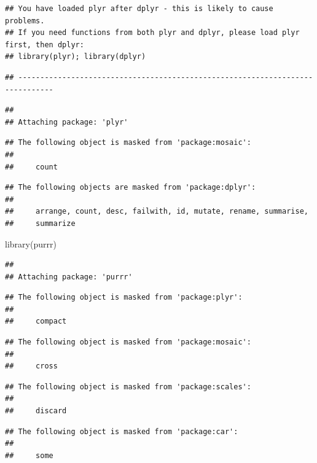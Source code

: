 \documentclass[
]{article}
\newenvironment{Shaded}{\begin{snugshade}}{\end{snugshade}}
\newcommand{\FunctionTok}[1]{\textcolor[rgb]{0.00,0.00,0.00}{#1}}
\newcommand{\NormalTok}[1]{#1}
\begin{document}
\begin{verbatim}
## You have loaded plyr after dplyr - this is likely to cause problems.
## If you need functions from both plyr and dplyr, please load plyr first, then dplyr:
## library(plyr); library(dplyr)
\end{verbatim}

\begin{verbatim}
## ------------------------------------------------------------------------------
\end{verbatim}

\begin{verbatim}
## 
## Attaching package: 'plyr'
\end{verbatim}

\begin{verbatim}
## The following object is masked from 'package:mosaic':
## 
##     count
\end{verbatim}

\begin{verbatim}
## The following objects are masked from 'package:dplyr':
## 
##     arrange, count, desc, failwith, id, mutate, rename, summarise,
##     summarize
\end{verbatim}

\begin{Shaded}
\begin{Highlighting}[]
\FunctionTok{library}\NormalTok{(purrr)}
\end{Highlighting}
\end{Shaded}

\begin{verbatim}
## 
## Attaching package: 'purrr'
\end{verbatim}

\begin{verbatim}
## The following object is masked from 'package:plyr':
## 
##     compact
\end{verbatim}

\begin{verbatim}
## The following object is masked from 'package:mosaic':
## 
##     cross
\end{verbatim}

\begin{verbatim}
## The following object is masked from 'package:scales':
## 
##     discard
\end{verbatim}

\begin{verbatim}
## The following object is masked from 'package:car':
## 
##     some
\end{verbatim}
\end{document}
